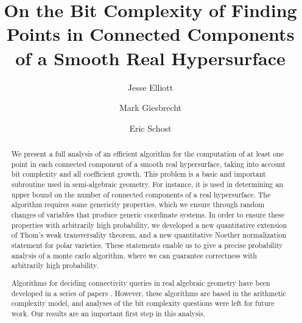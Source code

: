 \documentclass[sigconf]{acmart}
\begin{document}
\title{On the Bit Complexity of Finding Points in Connected Components of a Smooth Real Hypersurface}

\author{Jesse Elliott}

\author{Mark Giesbrecht}

\author{Eric Schost}
\renewcommand{\shortauthors}{Elliott, Giesbrecht, and Schost.}

\begin{abstract}
  We present a full analysis of an efficient algorithm for the
  computation of at least one point in each connected component of a
  smooth real hypersurface, taking into account bit complexity and
  all coefficient growth.  This problem is a basic and important
  subroutine used in semi-algebraic geometry. For instance, it is used
  in determining an upper bound on the number of connected components
  of a real hypersurface. The algorithm requires some genericity
  properties, which we ensure through random changes of variables that
  produce generic coordinate systems. In order to ensure these
  properties with arbitrarily high probability, we developed a new
  quantitative extension of Thom's weak transversality theorem, and a
  new quantitative Noether normalization statement for polar
  varieties. These statements enable us to give a precise probability
  analysis of a monte carlo algorithm, where we can guarantee
  correctness with arbitrarily high probability.

  Algorithms for deciding connectivity queries in real algebraic
  geometry have been developed in a series of papers
  \cite{a,b,c,d}. However, these algorithms are based in the
  arithmetic complexity model, and analyses of the bit complexity
  questions were left for future work.  Our results are an important
  first step in this analysis.

\end{abstract}
\end{document}

